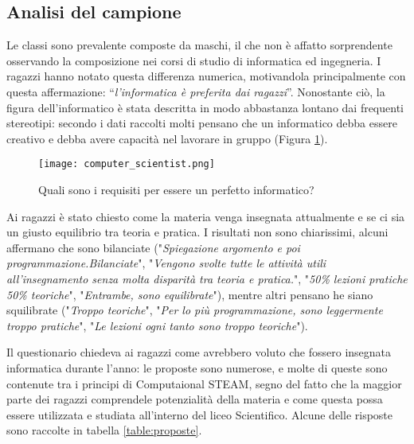 \subsection{Analisi del campione}
Le classi sono prevalente composte da maschi, il che non è affatto sorprendente osservando la composizione nei corsi di studio di informatica ed ingegneria. I ragazzi hanno notato questa differenza numerica, motivandola principalmente con questa affermazione: “\textit{l'informatica è preferita dai ragazzi}”. Nonostante ciò, la figura dell’informatico è stata descritta in modo abbastanza lontano dai frequenti stereotipi: secondo i dati raccolti molti pensano che un informatico debba essere creativo e debba avere capacità nel lavorare in gruppo (Figura \ref{fig:computer_scientist}).

\begin{figure}[!ht]
    \centering
    \texttt{[image: computer\_scientist.png]}
    \caption{Quali sono i requisiti per essere un perfetto informatico?}
    \label{fig:computer_scientist}
\end{figure}

Ai ragazzi è stato chiesto come la materia venga insegnata attualmente e se ci sia un giusto equilibrio tra teoria e pratica. I risultati non sono chiarissimi, alcuni affermano che sono bilanciate ("\textit{Spiegazione argomento e poi programmazione.Bilanciate}", "\textit{Vengono svolte tutte le attività utili all'insegnamento senza molta disparità tra teoria e pratica.}", "\textit{50\% lezioni pratiche 50\% teoriche}", "\textit{Entrambe, sono equilibrate}"), mentre altri pensano he siano squilibrate ("\textit{Troppo teoriche}", "\textit{Per lo più programmazione, sono leggermente troppo pratiche}", "\textit{Le lezioni ogni tanto sono troppo teoriche}").

Il questionario chiedeva ai ragazzi come avrebbero voluto che fossero insegnata informatica durante l'anno:  le proposte sono numerose, e molte di queste sono contenute tra i principi di Computaional STEAM, segno del fatto che la maggior parte dei ragazzi comprendele potenzialità della materia e come questa possa essere utilizzata e studiata all'interno del liceo Scientifico. Alcune delle risposte sono raccolte in tabella \ref{table:proposte}.

